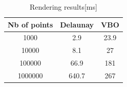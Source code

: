 \begin{table}[ht]
\caption{Rendering results[ms]} %
\centering %
\begin{tabular}{c c c} %
\hline\hline %
 Nb of points & Delaunay & VBO \\ [0.5ex] %
\hline %

1000 & 2.9 & 23.9 \\
10000 & 8.1	&	27 	\\
100000 & 66.9 & 181 \\
1000000 & 640.7	& 267 \\[1ex]


\hline %
\end{tabular}
\label{table:nonlin} %
\end{table}


